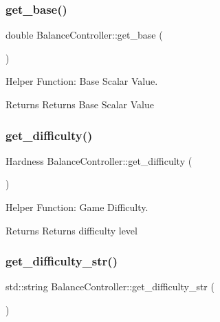 \subsubsection{\texorpdfstring{get\+\_\+base()}{get\_base()}}
{\footnotesize\ttfamily double Balance\+Controller\+::get\+\_\+base (\begin{DoxyParamCaption}{ }\end{DoxyParamCaption})}



Helper Function\+: Base Scalar Value. 

\begin{DoxyReturn}{Returns}
Returns Base Scalar Value 
\end{DoxyReturn}
\mbox{\label{classBalanceController_ab533d0f17d9e616c208049dc318a9dc8}} 
\subsubsection{\texorpdfstring{get\+\_\+difficulty()}{get\_difficulty()}}
{\footnotesize\ttfamily Hardness Balance\+Controller\+::get\+\_\+difficulty (\begin{DoxyParamCaption}{ }\end{DoxyParamCaption})}



Helper Function\+: Game Difficulty. 

\begin{DoxyReturn}{Returns}
Returns difficulty level 
\end{DoxyReturn}
\mbox{\label{classBalanceController_a882a510066a59049b37bacd83a303267}} 
\subsubsection{\texorpdfstring{get\+\_\+difficulty\+\_\+str()}{get\_difficulty\_str()}}
{\footnotesize\ttfamily std\+::string Balance\+Controller\+::get\+\_\+difficulty\+\_\+str (\begin{DoxyParamCaption}{ }\end{DoxyParamCaption})}



